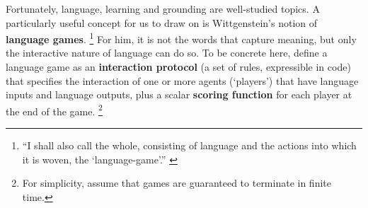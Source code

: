 \documentclass[dvipsnames]{article} %
\begin{document}
Fortunately, language, learning and grounding are well-studied topics.
A particularly useful concept for us to draw on is Wittgenstein's notion of {\bf language games}.%
\footnote{``I shall also call the whole, consisting of language and the actions into which it is woven, the `language-game'.'' \citep{wittgenstein-philosophical}}
For him, it is not the words that capture meaning, but only the interactive nature of language can do so.
To be concrete here, define a language game as an {\bf interaction protocol} (a set of rules, expressible in code) that specifies the interaction of one or more agents (`players') that have language inputs and language outputs, plus a scalar {\bf scoring function} for each player at the end
of the game.%
\footnote{For simplicity, assume that games are guaranteed to terminate in finite time.}
\end{document}
